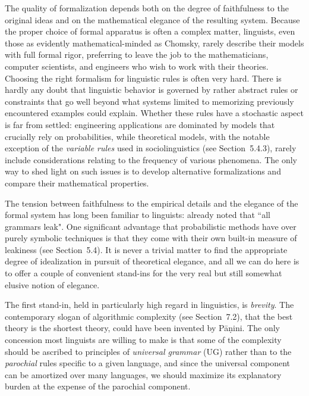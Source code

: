The quality of formalization depends both on the degree of faithfulness to the
original ideas and on the mathematical elegance of the resulting system.
Because the proper choice of formal apparatus is often a complex matter,
linguists, even those as evidently mathematical-minded as Chomsky, rarely
describe their models with full formal rigor, preferring to leave the job to
the mathematicians, computer scientists, and engineers who wish to work with
their theories. Choosing the right formalism for linguistic rules is often
very hard. There is hardly any doubt that linguistic behavior is governed by
rather abstract rules or constraints that go well beyond what systems limited
to memorizing previously encountered examples could explain.  Whether these
rules have a stochastic aspect is far from settled: engineering applications
are dominated by models that crucially rely on probabilities, while
theoretical models, with the notable exception of the {\it variable rules}
used in sociolinguistics (see Section~5.4.3), rarely include considerations
relating to the frequency of various phenomena.  The only way to shed light on
such issues is to develop alternative formalizations and compare their
mathematical properties.

The tension between faithfulness to the empirical details and the elegance of
the formal system has long been familiar to linguists: 
already noted that ``all grammars leak". One significant advantage that
probabilistic methods have over purely symbolic techniques is that they come
with their own built-in measure of leakiness (see Section~5.4). It is never a
trivial matter to find the appropriate degree of idealization in pursuit of
theoretical elegance, and all we can do here is to offer a couple of
convenient stand-ins for the very real but still somewhat elusive notion of
elegance.

The first stand-in, held in particularly high regard in linguistics, is {\it
  brevity}.  The contemporary slogan of algorithmic complexity (see
Section~7.2), that the best theory is the shortest theory, could have been
invented by P\={a}\d{n}ini.  The only concession most linguists are willing to
make is that some of the complexity should be ascribed to principles of {\it
  universal grammar} (UG) rather than to the {\it parochial} rules specific to
a given language, and since the universal component can be amortized over many
languages, we should maximize its explanatory burden at the expense of the
parochial component.


